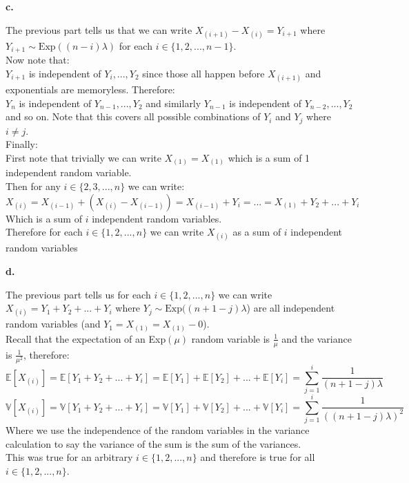 \documentclass{article}
\begin{document}
\newpage
{\Large\textbf{c.}}
\begin{center}
\doublespacing
    The previous part tells us that we can write $X_{(i+1)} - X_{(i)} = Y_{i+1}$ where $Y_{i+1}\sim\mbox{Exp}((n-i)\lambda)$ for each $i\in\{1, 2, ..., n-1\}$.
    \\Now note that:
    \\$Y_{i+1}$ is independent of $Y_{i}, ..., Y_2$ since those all happen before $X_{(i+1)}$ and exponentials are memoryless. Therefore:
    \\$Y_n$ is independent of $Y_{n-1}, ..., Y_2$ and similarly $Y_{n-1}$ is independent of $Y_{n-2}, ..., Y_2$ and so on. Note that this covers all possible combinations of $Y_i$ and $Y_j$ where $i\neq j$.
    \break
    \\Finally:
    \\First note that trivially we can write $X_{(1)} = X_{(1)}$ which is a sum of 1 independent random variable.
    \\Then for any $i\in\{2, 3, ..., n\}$ we can write:
    \[X_{(i)} = X_{(i-1)} + (X_{(i)} - X_{(i-1)}) = X_{(i-1)} + Y_i = ... = X_{(1)} + Y_2 + ... + Y_i\]
    Which is a sum of $i$ independent random variables.
    \\Therefore for each $i\in\{1, 2, ..., n\}$ we can write $X_{(i)}$ as a sum of $i$ independent random variables \qedsymbol
\end{center}

{\Large\textbf{d.}}
\begin{center}
\doublespacing
    The previous part tells us for each $i\in\{1, 2, ..., n\}$ we can write $X_{(i)} = Y_1 + Y_2 + ... + Y_i$ where $Y_j\sim\mbox{Exp}((n+1-j)\lambda$) are all independent random variables (and $Y_1 = X_{(1)} = X_{(1)} - 0$).
    \\Recall that the expectation of an Exp$(\mu)$ random variable is $\frac{1}{\mu}$ and the variance is $\frac{1}{\mu^2}$, therefore:
    \[\mathbb{E}[X_{(i)}] =\mathbb{E}[Y_1 + Y_2 + ... + Y_i] =\mathbb{E}[Y_1] +\mathbb{E}[Y_2] + ... +\mathbb{E}[Y_i] =\sum_{j=1}^i\frac{1}{(n+1-j)\lambda}\]
    \[\mathbb{V}[X_{(i)}] =\mathbb{V}[Y_1 + Y_2 + ... + Y_i] =\mathbb{V}[Y_1] +\mathbb{V}[Y_2] + ... +\mathbb{V}[Y_i] =\sum_{j=1}^i\frac{1}{((n+1-j)\lambda)^2}\]
    Where we use the independence of the random variables in the variance calculation to say the variance of the sum is the sum of the variances.
    \\This was true for an arbitrary $i\in\{1, 2, ..., n\}$ and therefore is true for all $i\in\{1, 2, ..., n\}$.
\end{center}
\end{document}
